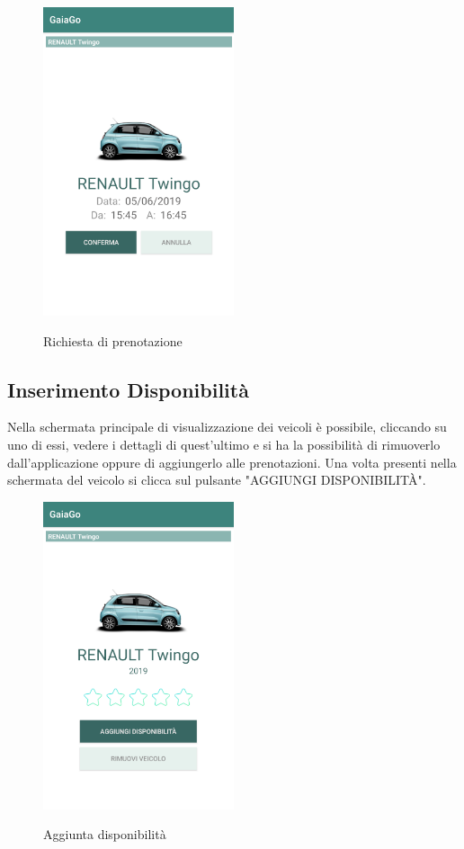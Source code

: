 \begin{itemize}
\begin{figure}[H]
		\includegraphics[width=0.5\textwidth]{res/images/conferma_prenotazione.png}\\
		\caption{Richiesta di prenotazione}
		\label{prenotazione}
	\end{figure}
\end{itemize}
\pagebreak

\subsection{Inserimento Disponibilità}
Nella schermata principale di visualizzazione dei veicoli è possibile, cliccando su uno di essi, vedere i dettagli di quest'ultimo e si ha la possibilità di rimuoverlo dall'applicazione oppure di aggiungerlo alle prenotazioni. Una volta presenti nella schermata del veicolo si clicca sul pulsante "AGGIUNGI DISPONIBILITÀ".
	  \begin{figure}[H] 
	\centering 
	\includegraphics[width=0.5\textwidth]{res/images/aggiungi_disponibilita1.png}\\
	\caption{Aggiunta disponibilità}
	\label{disponibilità}
\end{figure}
\pagebreak

